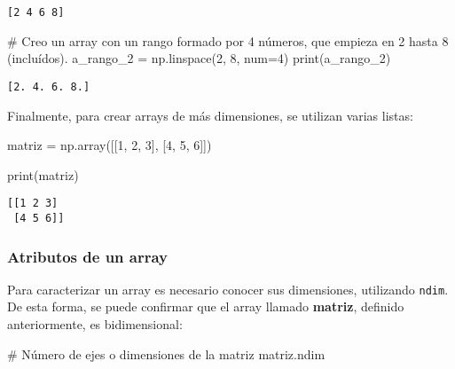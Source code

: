 \documentclass[
  letterpaper,
  DIV=11,
  numbers=noendperiod]{scrreprt}
\newenvironment{Shaded}{\begin{snugshade}}{\end{snugshade}}
\newcommand{\BuiltInTok}[1]{\textcolor[rgb]{0.00,0.23,0.31}{#1}}
\newcommand{\CommentTok}[1]{\textcolor[rgb]{0.37,0.37,0.37}{#1}}
\newcommand{\DecValTok}[1]{\textcolor[rgb]{0.68,0.00,0.00}{#1}}
\newcommand{\NormalTok}[1]{\textcolor[rgb]{0.00,0.23,0.31}{#1}}
\newcommand{\OperatorTok}[1]{\textcolor[rgb]{0.37,0.37,0.37}{#1}}
\begin{document}
\begin{verbatim}
[2 4 6 8]
\end{verbatim}

\begin{Shaded}
\begin{Highlighting}[]
\CommentTok{\# Creo un array con un rango formado por 4 números, que empieza en 2 hasta 8 (incluídos). }
\NormalTok{a\_rango\_2 }\OperatorTok{=}\NormalTok{ np.linspace(}\DecValTok{2}\NormalTok{, }\DecValTok{8}\NormalTok{, num}\OperatorTok{=}\DecValTok{4}\NormalTok{)}
\BuiltInTok{print}\NormalTok{(a\_rango\_2)}
\end{Highlighting}
\end{Shaded}

\begin{verbatim}
[2. 4. 6. 8.]
\end{verbatim}

Finalmente, para crear arrays de más dimensiones, se utilizan varias
listas:

\begin{Shaded}
\begin{Highlighting}[]
\NormalTok{matriz }\OperatorTok{=}\NormalTok{ np.array([[}\DecValTok{1}\NormalTok{, }\DecValTok{2}\NormalTok{, }\DecValTok{3}\NormalTok{], [}\DecValTok{4}\NormalTok{, }\DecValTok{5}\NormalTok{, }\DecValTok{6}\NormalTok{]])}

\BuiltInTok{print}\NormalTok{(matriz)}
\end{Highlighting}
\end{Shaded}

\begin{verbatim}
[[1 2 3]
 [4 5 6]]
\end{verbatim}

\subsubsection{Atributos de un array}\label{atributos-de-un-array}

Para caracterizar un array es necesario conocer sus dimensiones,
utilizando \texttt{ndim}. De esta forma, se puede confirmar que el array
llamado \textbf{matriz}, definido anteriormente, es bidimensional:

\begin{Shaded}
\begin{Highlighting}[]
\CommentTok{\# Número de ejes o dimensiones de la matriz}
\NormalTok{matriz.ndim}
\end{Highlighting}
\end{Shaded}
\end{document}
